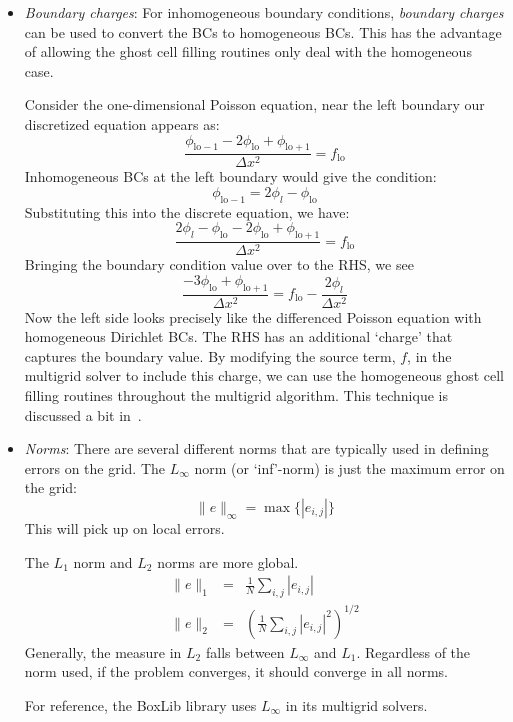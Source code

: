 \begin{itemize}
\item {\em Boundary charges}: For inhomogeneous boundary conditions,
{\em boundary charges} can be used to convert the BCs to homogeneous
BCs.  This has the advantage of allowing the ghost cell filling 
routines only deal with the homogeneous case.

Consider the one-dimensional Poisson equation, near the left boundary
our discretized equation appears as:
\begin{equation}
\frac{\phi_\mathrm{lo-1} - 2\phi_\mathrm{lo} + \phi_\mathrm{lo+1}}{\Delta x^2}
 = f_\mathrm{lo}
\end{equation}
Inhomogeneous BCs at the left boundary would give the condition:
\begin{equation}
\phi_\mathrm{lo-1} = 2 \phi_l - \phi_\mathrm{lo}
\end{equation}
Substituting this into the discrete equation, we have:
\begin{equation}
\frac{2 \phi_l - \phi_\mathrm{lo} - 2\phi_\mathrm{lo} + \phi_\mathrm{lo+1}}{\Delta x^2}
 = f_\mathrm{lo}
\end{equation}
Bringing the boundary condition value over to the RHS, we see
\begin{equation}
\frac{- 3\phi_\mathrm{lo} + \phi_\mathrm{lo+1}}{\Delta x^2}
 = f_\mathrm{lo} - \frac{2\phi_l}{\Delta x^2}
\end{equation}
Now the left side looks precisely like the differenced Poisson equation
with homogeneous Dirichlet BCs.  The RHS has an additional `charge' that
captures the boundary value.  By modifying the source term, $f$, in the
multigrid solver to include this charge, we can use the homogeneous 
ghost cell filling routines throughout the multigrid algorithm.
This technique is discussed a bit in~\cite{colellanotes}.

\item {\em Norms}: There are several different norms that are typically
used in defining errors on the grid.  The $L_\infty$ norm (or `inf'-norm)
is just the maximum error on the grid:
\begin{equation}
\|e\|_\infty = \max \{ |e_{i,j}| \}
\end{equation}
This will pick up on local errors.  

The $L_1$ norm and $L_2$ norms are more global. 
\begin{eqnarray}
\|e\|_1 &=& \frac{1}{N} \sum_{i,j} |e_{i,j} | \\
\|e\|_2 &=& \left ( \frac{1}{N} \sum_{i,j} |e_{i,j} |^2 \right )^{1/2}
\end{eqnarray}
Generally, the measure in $L_2$ falls between $L_\infty$ and $L_1$.
Regardless of the norm used, if the problem converges, it should
converge in all norms.

For reference, the BoxLib library uses $L_\infty$ in its multigrid solvers.

\end{itemize}



